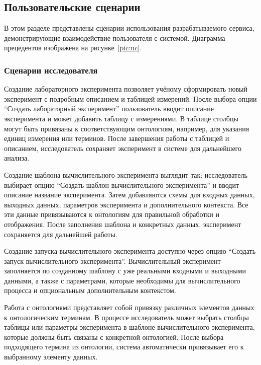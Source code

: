 \setcounter{section}{2}
\setcounter{subsection}{0}


\subsection{Пользовательские сценарии}

В этом разделе представлены сценарии использования разрабатываемого сервиса, демонстрирующие взаимодействие пользователя с системой. Диаграмма прецедентов изображена на рисунке~\ref{pic:uc}.

\subsubsection{Сценарии исследователя}

Создание лабораторного эксперимента позволяет учёному сформировать новый эксперимент с подробным описанием и таблицей измерений. После выбора опции “Создать лабораторный эксперимент” пользователь вводит описание эксперимента и может добавить таблицу с измерениями. В таблице столбцы могут быть привязаны к соответствующим онтологиям, например, для указания единиц измерения или терминов. После завершения работы с таблицей и описанием, исследователь сохраняет эксперимент в системе для дальнейшего анализа.

Создание шаблона вычислительного эксперимента выглядит так: исследователь выбирает опцию “Создать шаблон вычислительного эксперимента” и вводит описание название эксперимента. Затем добавляются схемы для входных данных, выходных данных, параметров эксперимента и дополнительного контекста. Все эти данные привязываются к онтологиям для правильной обработки и отображения. После заполнения шаблона и конкретных данных, эксперимент сохраняется для дальнейшей работы.

Создание запуска вычислительного эксперимента доступно через опцию “Создать запуск вычислительного эксперимента”. Вычислительный эксперимент заполняется по созданному шаблону с уже реальными входными и выходными данными, а также с параметрами, которые необходимы для вычислительного процесса и опциональным дополнительным контекстом.

Работа с онтологиями представляет собой привязку различных элементов данных к онтологическим терминам. В процессе исследователь может выбрать столбцы таблицы или параметры эксперимента в шаблоне вычислительного эксперимента, которые должны быть связаны с конкретной онтологией. После выбора подходящего термина из онтологии, система автоматически привязывает его к выбранному элементу данных.

